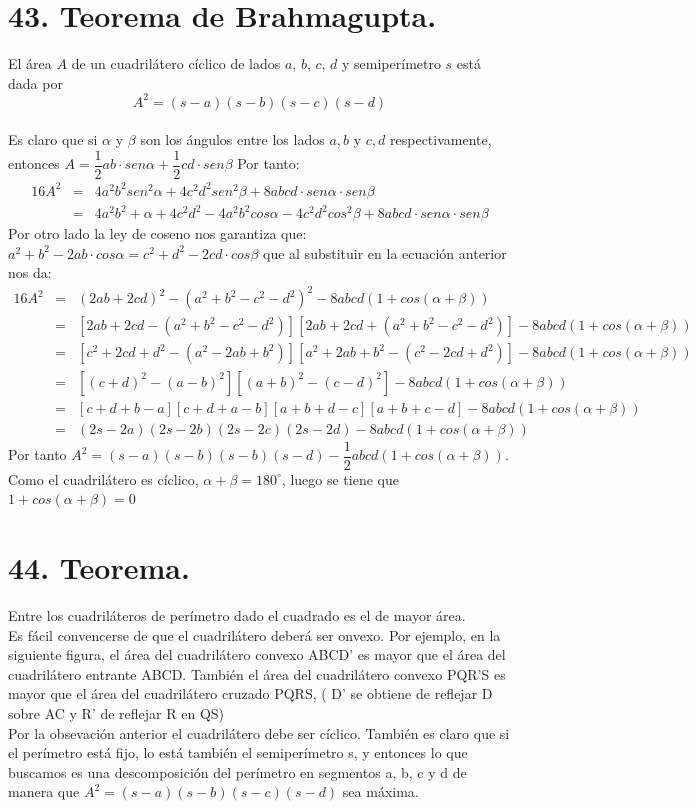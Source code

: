 \documentclass[12pt,a4paper, oneside]{book}
\begin{document}
\section{43. Teorema de Brahmagupta.}
El área $A$ de un cuadrilátero cíclico de lados $a$, $b$, $c$, $d$ y semiperímetro $s$ está dada por $$A^2=(s-a)(s-b)(s-c)(s-d)$$
\\
Es claro que si $\alpha$ y $\beta$ son los ángulos entre los lados $ a, b$ y $c, d$ respectivamente, entonces $A= \dfrac{1}{2}ab \cdot sen \alpha + \dfrac{1}{2}cd \cdot sen \beta$ Por tanto:
\begin{eqnarray*}
16 A^2&=& 4a^2b^2 sen^2 \alpha + 4c^2 d^2 sen ^2 \beta +8abcd \cdot sen \alpha \cdot sen \beta
\\&=& 4a^2b^2 + \alpha + 4c^2 d^2 -4a^2b^2cos \alpha - 4c^2 d^2 cos^2 \beta +8abcd\cdot sen \alpha \cdot sen \beta
\end{eqnarray*}
Por otro lado la ley de coseno nos garantiza que: 
$a^2+ b^2 - 2ab \cdot cos \alpha = c^2 + d^2 - 2cd \cdot cos \beta$
que al substituir  en la ecuación anterior nos da:
\begin{eqnarray*}
16 A^2&=& (2ab + 2cd)^2 -(a^2 + b^2 - c^2 -d^2)^2-8abcd (1+cos(\alpha + \beta))
\\&=& [2ab + 2cd- (a^2+ b^2 -c^2 -d^2)][2ab + 2cd + (a^2+ b^2- c^2 -d^2)]- 8abcd(1 + cos(\alpha + \beta))
\\&=&[c^2 +2cd +d^2 -(a^2-2ab+ b^2)][a^2+2ab+b^2-(c^2-2cd+d^2)]-8abcd(1+cos(\alpha + \beta))
\\&=&[(c+d)^2- (a-b)^2][(a+b)^2- (c-d)^2]-8abcd(1+ cos(\alpha + \beta))
\\&=&[c+d+b-a][c+d+a-b][a+b+d-c][a+b+c-d]-8abcd(1+cos(\alpha + \beta))
\\&=&(2s-2a)(2s-2b)(2s-2c)(2s-2d)-8abcd(1+cos(\alpha + \beta))
\end{eqnarray*}
Por tanto $A^2=(s-a)(s-b)(s-b)(s-d)-\dfrac{1}{2}abcd(1+cos(\alpha + \beta))$. Como el cuadrilátero es cíclico, $\alpha + \beta = 180^\circ$, luego se tiene que $1+cos(\alpha + \beta)=0$
\section{44. Teorema.}
Entre los cuadriláteros de perímetro dado el cuadrado es el de mayor área.
\\
Es fácil convencerse de que el cuadrilátero deberá ser onvexo. Por ejemplo, en la siguiente figura, el área del cuadrilátero convexo ABCD' es mayor que el área del cuadrilátero entrante ABCD. También el área del cuadrilátero convexo PQR'S es mayor que el área del cuadrilátero cruzado PQRS, ( D' se obtiene  de reflejar D sobre AC y R' de reflejar R en QS)
\\Por la obsevación anterior el cuadrilátero debe ser cíclico. También  es claro que si el perímetro está fijo, lo está también el semiperímetro s, y entonces lo que buscamos es una descomposición del perímetro en segmentos a, b, c y d de manera que $A^2=(s-a)(s-b)(s-c)(s-d)$ sea máxima. 
\end{document}
